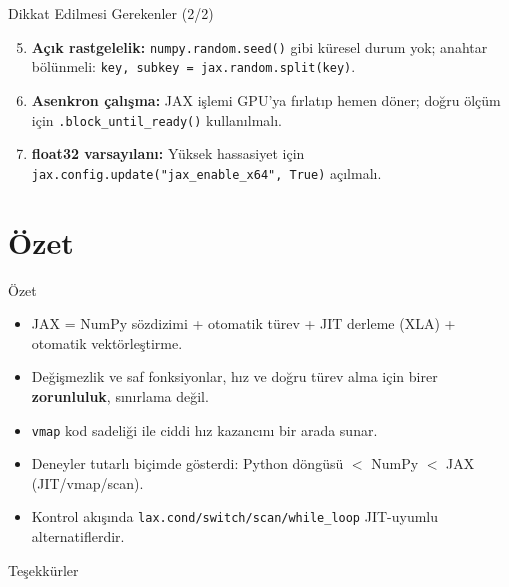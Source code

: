 \documentclass[aspectratio=169]{beamer}
\begin{document}
\begin{frame}{Dikkat Edilmesi Gerekenler (2/2)}
  \begin{enumerate}
    \setcounter{enumi}{4}
    \item \textbf{Açık rastgelelik:} \texttt{numpy.random.seed()} gibi küresel durum yok; anahtar bölünmeli: \texttt{key, subkey = jax.random.split(key)}.
    \item \textbf{Asenkron çalışma:} JAX işlemi GPU'ya fırlatıp hemen döner; doğru ölçüm için \texttt{.block\_until\_ready()} kullanılmalı.
    \item \textbf{float32 varsayılanı:} Yüksek hassasiyet için \texttt{jax.config.update("jax\_enable\_x64", True)} açılmalı.
  \end{enumerate}
\end{frame}

\section{Özet}

\begin{frame}{Özet}
  \begin{itemize}
    \item JAX = NumPy sözdizimi + otomatik türev + JIT derleme (XLA) + otomatik vektörleştirme.
    \item Değişmezlik ve saf fonksiyonlar, hız ve doğru türev alma için birer \textbf{zorunluluk}, sınırlama değil.
    \item \texttt{vmap} kod sadeliği ile ciddi hız kazancını bir arada sunar.
    \item Deneyler tutarlı biçimde gösterdi: Python döngüsü $<$ NumPy $<$ JAX (JIT/vmap/scan).
    \item Kontrol akışında \texttt{lax.cond/switch/scan/while\_loop} JIT-uyumlu alternatiflerdir.
  \end{itemize}
\end{frame}

\begin{frame}
  \centering
  \Huge Teşekkürler
\end{frame}
\end{document}
